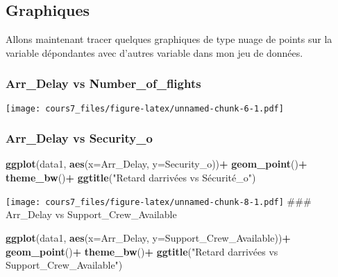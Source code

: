 \documentclass[
]{article}
\newenvironment{Shaded}{\begin{snugshade}}{\end{snugshade}}
\newcommand{\AttributeTok}[1]{\textcolor[rgb]{0.13,0.29,0.53}{#1}}
\newcommand{\FunctionTok}[1]{\textcolor[rgb]{0.13,0.29,0.53}{\textbf{#1}}}
\newcommand{\NormalTok}[1]{#1}
\newcommand{\SpecialCharTok}[1]{\textcolor[rgb]{0.81,0.36,0.00}{\textbf{#1}}}
\newcommand{\StringTok}[1]{\textcolor[rgb]{0.31,0.60,0.02}{#1}}
\begin{document}
\hypertarget{graphiques}{%
\subsection{Graphiques}\label{graphiques}}

Allons maintenant tracer quelques graphiques de type nuage de points sur
la variable dépondantes avec d'autres variable dans mon jeu de données.

\hypertarget{arr_delay-vs-number_of_flights}{%
\subsubsection{Arr\_Delay vs
Number\_of\_flights}\label{arr_delay-vs-number_of_flights}}

\begin{Shaded}
\end{Shaded}

\texttt{[image: cours7\_files/figure-latex/unnamed-chunk-6-1.pdf]}

\hypertarget{arr_delay-vs-security_o}{%
\subsubsection{Arr\_Delay vs
Security\_o}\label{arr_delay-vs-security_o}}

\begin{Shaded}
\begin{Highlighting}[]
\FunctionTok{ggplot}\NormalTok{(data1, }\FunctionTok{aes}\NormalTok{(}\AttributeTok{x=}\NormalTok{Arr\_Delay, }\AttributeTok{y=}\NormalTok{Security\_o))}\SpecialCharTok{+}
  \FunctionTok{geom\_point}\NormalTok{()}\SpecialCharTok{+}
  \FunctionTok{theme\_bw}\NormalTok{()}\SpecialCharTok{+}
  \FunctionTok{ggtitle}\NormalTok{(}\StringTok{"Retard d\textquotesingle{}arrivées vs Sécurité\_o"}\NormalTok{)}
\end{Highlighting}
\end{Shaded}

\texttt{[image: cours7\_files/figure-latex/unnamed-chunk-8-1.pdf]} \#\#\#
Arr\_Delay vs Support\_Crew\_Available

\begin{Shaded}
\begin{Highlighting}[]
\FunctionTok{ggplot}\NormalTok{(data1, }\FunctionTok{aes}\NormalTok{(}\AttributeTok{x=}\NormalTok{Arr\_Delay, }\AttributeTok{y=}\NormalTok{Support\_Crew\_Available))}\SpecialCharTok{+}
  \FunctionTok{geom\_point}\NormalTok{()}\SpecialCharTok{+}
  \FunctionTok{theme\_bw}\NormalTok{()}\SpecialCharTok{+}
  \FunctionTok{ggtitle}\NormalTok{(}\StringTok{"Retard d\textquotesingle{}arrivées vs Support\_Crew\_Available"}\NormalTok{)}
\end{Highlighting}
\end{Shaded}
\end{document}
